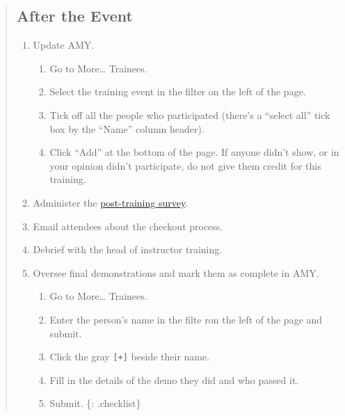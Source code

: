 \begin{quote}
\subsection{After the Event}\label{after-the-event}

\begin{enumerate}
\def\labelenumi{\arabic{enumi}.}
\itemsep1pt\parskip0pt
\item
  Update AMY.

  \begin{enumerate}
  \def\labelenumii{\arabic{enumii}.}
  \itemsep1pt\parskip0pt
  \item
    Go to More\ldots{} Trainees.
  \item
    Select the training event in the filter on the left of the page.
  \item
    Tick off all the people who participated (there's a ``select all''
    tick box by the ``Name'' column header).
  \item
    Click ``Add'' at the bottom of the page. If anyone didn't show, or
    in your opinion didn't participate, do not give them credit for this
    training.
  \end{enumerate}
\item
  Administer the \href{\{\{site.training\_post\_survey\}\}}{post-training
  survey}.
\item
  Email attendees about
  the checkout process.
\item
  Debrief with the head of instructor training.
\item
  Oversee final demonstrations and mark them as complete in AMY.

  \begin{enumerate}
  \def\labelenumii{\arabic{enumii}.}
  \itemsep1pt\parskip0pt
  \item
    Go to More\ldots{} Trainees.
  \item
    Enter the person's name in the filte ron the left of the page and
    submit.
  \item
    Click the gray \texttt{{[}+{]}} beside their name.
  \item
    Fill in the details of the demo they did and who passed it.
  \item
    Submit. \{: .checklist\}
  \end{enumerate}
\end{enumerate}
\end{quote}

